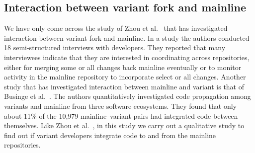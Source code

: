\subsection{Interaction between variant fork and mainline}
We have only come across the study of Zhou et al.~\cite{Zhou:2020} that has investigated interaction between variant fork and mainline.
In a study the authors conducted 18 semi-structured interviews with developers. They reported that many interviewees indicate that they are interested in coordinating across repositories, either for merging some or all changes back mainline eventually or to monitor activity in the mainline repository to incorporate select or all changes. Another study that has investigated interaction between mainline and variant is that of Businge et al.~\cite{businge:emse:2021}. The authors quantitatively investigated code propagation among variants and mainline from three software ecosystems. They found that only about 11\% of the 10,979 mainline--variant pairs had integrated code between themselves. Like Zhou et al.~\cite{Zhou:2020}, in this study we carry out a qualitative study to find out if variant developers integrate code to and from the mainline repositories.

